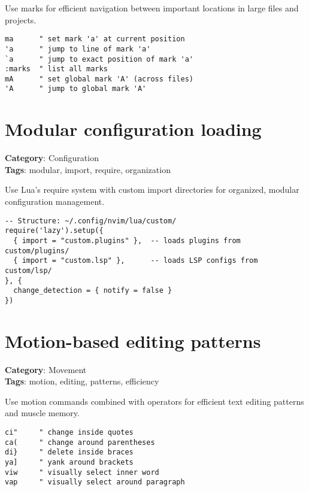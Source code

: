 {{{{Use marks for efficient navigation between important locations in large files and projects.

\begin{Exa*}{}
\begin{Verbatim}[fontsize=\footnotesize, breaklines, breakanywhere]
ma      " set mark 'a' at current position
'a      " jump to line of mark 'a'
`a      " jump to exact position of mark 'a'  
:marks  " list all marks
mA      " set global mark 'A' (across files)
'A      " jump to global mark 'A'
\end{Verbatim}
\end{Exa*}

\section{Modular configuration loading}

\textbf{Category}: Configuration\\ \textbf{Tags}: modular, import, require, organization
\vspace{0.5cm}

Use Lua's require system with custom import directories for organized, modular configuration management.

\begin{Exa*}{}
\begin{Verbatim}[fontsize=\footnotesize, breaklines, breakanywhere]
-- Structure: ~/.config/nvim/lua/custom/
require('lazy').setup({
  { import = "custom.plugins" },  -- loads plugins from custom/plugins/
  { import = "custom.lsp" },      -- loads LSP configs from custom/lsp/
}, {
  change_detection = { notify = false }
})
\end{Verbatim}
\end{Exa*}

\section{Motion-based editing patterns}

\textbf{Category}: Movement\\ \textbf{Tags}: motion, editing, patterns, efficiency
\vspace{0.5cm}

Use motion commands combined with operators for efficient text editing patterns and muscle memory.

\begin{Exa*}{}
\begin{Verbatim}[fontsize=\footnotesize, breaklines, breakanywhere]
ci"     " change inside quotes
ca(     " change around parentheses  
di}     " delete inside braces
ya]     " yank around brackets
viw     " visually select inner word
vap     " visually select around paragraph
\end{Verbatim}
\end{Exa*}

}}}}
